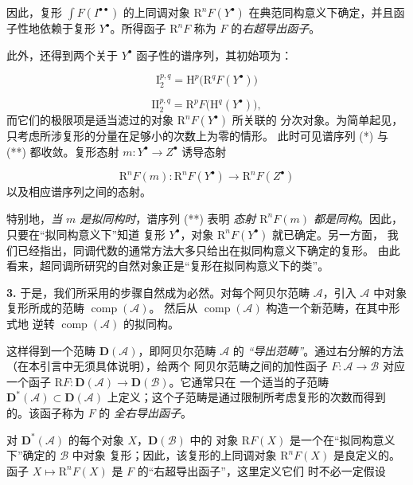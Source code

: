 \clearpage
{}
因此，复形 $\int F(I^{\bullet\bullet})$ 的上同调对象
$\mathrm R^nF(Y^{\bullet})$ 在典范同构意义下确定，并且函子性地依赖于复形
$Y^{\bullet}$。所得函子 $\mathrm R^nF$ 称为 $F$ 的\emph{右超导出函子}。

此外，还得到两个关于 $Y^{\bullet}$ 函子性的谱序列，其初始项为：

\begin{equation}
\mathrm I_2^{p,q}=\mathrm H^p\bigl(\mathrm R^qF(Y^{\bullet})\bigr)
\tag{*}
\end{equation}

\begin{equation}
\mathrm{II}_2^{p,q}=\mathrm R^pF\bigl(\mathrm H^q(Y^{\bullet})\bigr),
\tag{**}
\end{equation}
而它们的极限项是适当滤过的对象 $\mathrm R^nF(Y^{\bullet})$ 所关联的
分次对象。为简单起见，只考虑所涉复形的分量在足够小的次数上为零的情形。
此时可见谱序列 (*) 与 (**) 都收敛。复形态射
$m:Y^{\bullet}\to Z^{\bullet}$ 诱导态射

\[
\mathrm R^nF(m):\mathrm R^nF(Y^{\bullet})
\longrightarrow \mathrm R^nF(Z^{\bullet})
\]
以及相应谱序列之间的态射。

特别地，\emph{当 $m$ 是拟同构时}，谱序列 (**) 表明
\emph{态射 $\mathrm R^nF(m)$ 都是同构}。因此，只要在“拟同构意义下”知道
复形 $Y^{\bullet}$，对象 $\mathrm R^nF(Y^{\bullet})$ 就已确定。另一方面，
我们已经指出，同调代数的通常方法大多只给出在拟同构意义下确定的复形。
由此看来，超同调所研究的自然对象正是“复形在拟同构意义下的类”。

\noindent\textbf{3.}\quad
于是，我们所采用的步骤自然成为必然。对每个阿贝尔范畴 $\mathcal A$，引入
$\mathcal A$ 中对象复形所成的范畴 $\operatorname{comp}(\mathcal A)$。
然后从 $\operatorname{comp}(\mathcal A)$ 构造一个新范畴，在其中形式地
逆转 $\operatorname{comp}(\mathcal A)$ 的拟同构。

这样得到一个范畴 $\mathbf D(\mathcal A)$，即阿贝尔范畴 $\mathcal A$ 的
\emph{“导出范畴”}。通过右分解的方法（在本引言中无须具体说明），给两个
阿贝尔范畴之间的加性函子 $F:\mathcal A\to\mathcal B$ 对应一个函子
$\mathrm RF:\mathbf D(\mathcal A)\to\mathbf D(\mathcal B)$。它通常只在
一个适当的子范畴 $\mathbf D^*(\mathcal A)\subset\mathbf D(\mathcal A)$
上定义；这个子范畴是通过限制所考虑复形的次数而得到的。该函子称为 $F$ 的
\emph{全右导出函子}。

对 $\mathbf D^*(\mathcal A)$ 的每个对象 $X$，$\mathbf D(\mathcal B)$ 中的
对象 $\mathrm RF(X)$ 是一个在“拟同构意义下”确定的 $\mathcal B$ 中对象
复形；因此，该复形的上同调对象 $\mathrm R^nF(X)$ 是良定义的。函子
$X\longmapsto\mathrm R^nF(X)$ 是 $F$ 的“右超导出函子”，这里定义它们
时不必一定假设
